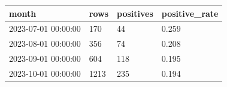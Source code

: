 \begin{table}[t]
\centering
\begin{tabular}{llll}
\hline
month & rows & positives & positive_rate \\
\hline
2023-07-01 00:00:00 & 170 & 44 & 0.259 \\
2023-08-01 00:00:00 & 356 & 74 & 0.208 \\
2023-09-01 00:00:00 & 604 & 118 & 0.195 \\
2023-10-01 00:00:00 & 1213 & 235 & 0.194 \\
\hline
\end{tabular}
\end{table}
